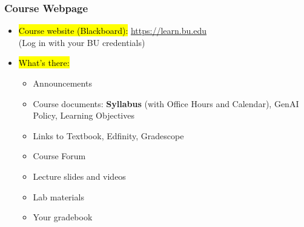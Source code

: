 \documentclass[slidestop,compress,mathserif]{beamer}
\begin{document}
\begin{frame}
	\frametitle{Course Webpage} 
	\begin{itemize}
		\item \hl{Course website (Blackboard):} \url{https://learn.bu.edu} \\
		(Log in with your BU credentials)
		\item \hl{What's there:}
		\begin{itemize}
			\item Announcements
			\item Course documents: \textbf{Syllabus} (with Office Hours and Calendar), GenAI Policy, Learning Objectives
			\item Links to Textbook, Edfinity, Gradescope
			\item Course Forum
			\item Lecture slides and videos
			\item Lab materials
			\item Your gradebook
		\end{itemize}
	\end{itemize}	
\end{frame}

\end{document}
